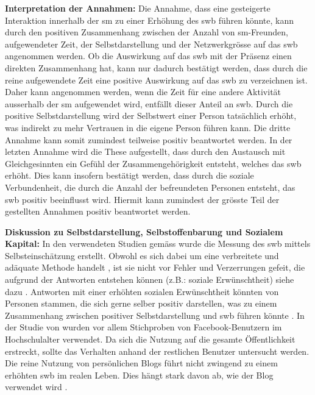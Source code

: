 \textbf{Interpretation der Annahmen:}\newline
Die Annahme, dass eine gesteigerte Interaktion innerhalb der \gls{sm} zu einer Erhöhung des \gls{swb} führen könnte, kann durch den positiven Zusammenhang zwischen der Anzahl von \gls{sm}-Freunden, aufgewendeter Zeit, der Selbstdarstellung und der Netzwerkgrösse auf das \gls{swb} angenommen werden.\newline
Ob die Auswirkung auf das \gls{swb} mit der Präsenz einen direkten Zusammenhang hat, kann nur dadurch bestätigt werden, dass durch die reine aufgewendete Zeit eine positive Auswirkung auf das \gls{swb} zu verzeichnen ist. Daher kann angenommen werden, wenn die Zeit für eine andere Aktivität ausserhalb der \gls{sm} aufgewendet wird, entfällt dieser Anteil an \gls{swb}.\newline
Durch die positive Selbstdarstellung wird der Selbstwert einer Person tatsächlich erhöht, was indirekt zu mehr Vertrauen in die eigene Person führen kann. Die dritte Annahme kann somit zumindest teilweise positiv beantwortet werden.\newline
In der letzten Annahme wird die These aufgestellt, dass durch den Austausch mit Gleichgesinnten ein Gefühl der Zusammengehörigkeit entsteht, welches das \gls{swb} erhöht. Dies kann insofern bestätigt werden, dass durch die soziale Verbundenheit, die durch die Anzahl der befreundeten Personen entsteht, das \gls{swb} positiv beeinflusst wird.\newline
Hiermit kann zumindest der grösste Teil der gestellten Annahmen positiv beantwortet werden.\par  
\textbf{Diskussion zu Selbstdarstellung, Selbstoffenbarung und Sozialem Kapital:}\newline
In den verwendeten Studien gemäss  wurde die Messung des \gls{swb} mittels Selbsteinschätzung erstellt. Obwohl es sich dabei um eine verbreitete und adäquate Methode handelt \cite{Diener:2005}, ist sie nicht vor Fehler und Verzerrungen gefeit, die aufgrund der Antworten entstehen können (z.B.: soziale Erwünschtheit) siehe dazu . Antworten mit einer erhöhten sozialen Erwünschtheit könnten von Personen stammen, die sich gerne selber positiv darstellen, was zu einem Zusammenhang zwischen positiver Selbstdarstellung und \gls{swb} führen könnte \cite{Diener:1991}.\newline
In der Studie von  wurden vor allem Stichproben von Facebook-Benutzern im Hochschulalter verwendet. Da sich die Nutzung auf die gesamte Öffentlichkeit erstreckt, sollte das Verhalten anhand der restlichen Benutzer untersucht werden.\newline
Die reine Nutzung von persönlichen Blogs führt nicht zwingend zu einem erhöhten \gls{swb} im realen Leben. Dies hängt stark davon ab, wie der Blog verwendet wird \cite{Jung:2012}.\par 

